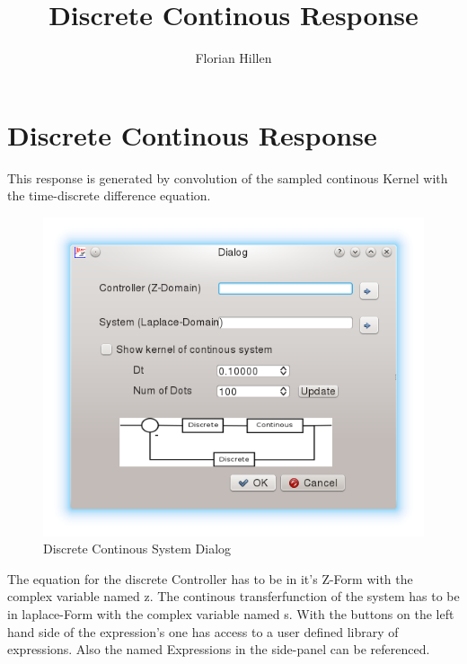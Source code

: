 \documentclass[a4paper,12pt]{article}
\title{Discrete Continous Response}
\author{Florian Hillen}
\begin{document}
\section{Discrete Continous Response}
This response is generated by convolution of the sampled continous Kernel with
the time-discrete difference equation.

\begin{figure}[htbp]
   \includegraphics[width=350pt, keepaspectratio]{discretecontinous.png}
   \centering
 \caption{Discrete Continous System Dialog}
\label{PROCESSDIA}
\end{figure}
The equation for the discrete Controller has to be in it's Z-Form with the
complex variable named z. The continous transferfunction of the system has to
be in laplace-Form with the complex variable named s.
With the buttons on the left hand side of the expression's one has access to a
user defined library of expressions. Also the named Expressions in the side-panel
can be referenced.
\end{document}
